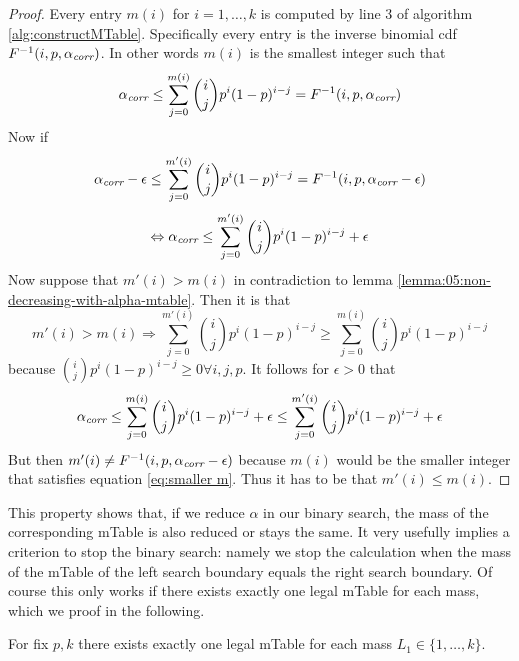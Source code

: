 \begin{proof}
\label{proof:05:non-decreasing-with-alpha-mtable}
Every entry $m(i)$ for $i=1,\ldots,k$ is computed by line 3 of algorithm \ref{alg:constructMTable}. Specifically every entry is the inverse binomial cdf $F^{-1}(i,p,\alpha_\textit{corr})$. In other words $m(i)$ is the smallest integer such that\\
\begin{equation}
\alpha_\textit{corr} \leq \sum_{j=0}^{m(i)}\binom{i}{j}p^i (1-p)^{i-j} = F^{-1}(i,p,\alpha_\textit{corr})
\end{equation}
Now if
\begin{equation}\label{eq:smaller m}
\alpha_\textit{corr} - \epsilon \leq \sum_{j=0}^{m'(i)}\binom{i}{j}p^i (1-p)^{i-j} = F^{-1}(i,p,\alpha_\textit{corr}-\epsilon)
\end{equation}
\begin{equation}
\Leftrightarrow \alpha_\textit{corr} \leq \sum_{j=0}^{m'(i)}\binom{i}{j}p^i (1-p)^{i-j} + \epsilon
\end{equation}
Now suppose that $m'(i) > m(i)$ in contradiction to lemma \ref{lemma:05:non-decreasing-with-alpha-mtable}. Then it is that
\[m'(i)>m(i) \Rightarrow \sum_{j=0}^{m'(i)}\binom{i}{j}p^i (1-p)^{i-j} \geq \sum_{j=0}^{m(i)}\binom{i}{j}p^i (1-p)^{i-j}\]
because $\binom{i}{j}p^i (1-p)^{i-j} \geq 0 \forall i,j,p$. It follows for $\epsilon >0$ that
\begin{equation}
\alpha_\textit{corr} \leq \sum_{j=0}^{m(i)}\binom{i}{j}p^i (1-p)^{i-j} + \epsilon \leq \sum_{j=0}^{m'(i)}\binom{i}{j}p^i (1-p)^{i-j} + \epsilon
\end{equation}
But then $m'(i)\neq F^{-1}(i,p,\alpha_\textit{corr}-\epsilon)$ because $m(i)$ would be the smaller integer that satisfies equation \ref{eq:smaller m}. Thus it has to be that $m'(i)\leq m(i)$.
\end{proof}
%
\noindent This property shows that, if we reduce $\alpha$ in our binary search, the mass of the corresponding mTable is also reduced or stays the same.
%
It very usefully implies a criterion to stop the binary search: namely we stop the calculation when the mass of the mTable of the left search boundary equals the right search boundary.
%
Of course this only works if there exists exactly one legal mTable for each mass, which we proof in the following.
\begin{theorem}
	\label{theorem:05:mtable-mass-injection}
	For fix $p,k$ there exists exactly one legal mTable for each mass $L_1\in \lbrace 1,\ldots,k \rbrace$.
\end{theorem}
%
